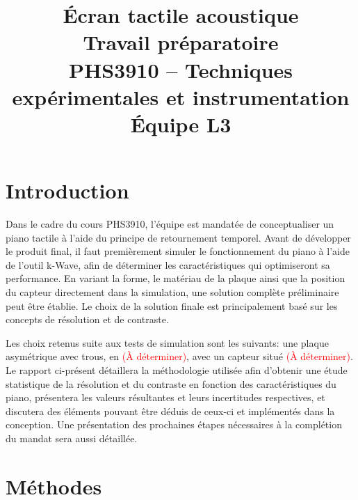 \documentclass[conference]{IEEEtran}
\begin{document}
\title{Écran tactile acoustique\\
\large Travail préparatoire \\
PHS3910 -- Techniques expérimentales et instrumentation\\ 
Équipe L3}

\author{
\and
{}
\and
{}
\and
{}
}

\maketitle

\section{Introduction}
Dans le cadre du cours PHS3910, l'équipe est mandatée de conceptualiser
un piano tactile à l'aide du principe de retournement temporel. Avant
de développer le produit final, il faut premièrement simuler le fonctionnement 
du piano à l'aide de l'outil k-Wave, afin de déterminer les caractéristiques qui 
optimiseront sa performance. En variant la forme, le matériau de 
la plaque ainsi que la position du capteur directement dans la simulation,
une solution complète préliminaire peut être établie. Le choix de la solution finale est
principalement basé sur les concepts de résolution et de contraste.

Les choix retenus suite aux tests de simulation sont les suivants: une plaque
asymétrique avec trous, en \textcolor{red}{(À déterminer)}, avec un capteur situé \textcolor{red}{(À déterminer)}.
Le rapport ci-présent détaillera la méthodologie utilisée afin d'obtenir 
une étude statistique de la résolution et du contraste en fonction des
caractéristiques du piano, présentera les valeurs résultantes et leurs incertitudes 
respectives, et discutera des éléments pouvant être déduis de ceux-ci et implémentés 
dans la conception. Une présentation des prochaines étapes nécessaires à la complétion
du mandat sera aussi détaillée.

\section{Méthodes \label{methodes}}
\end{document}
